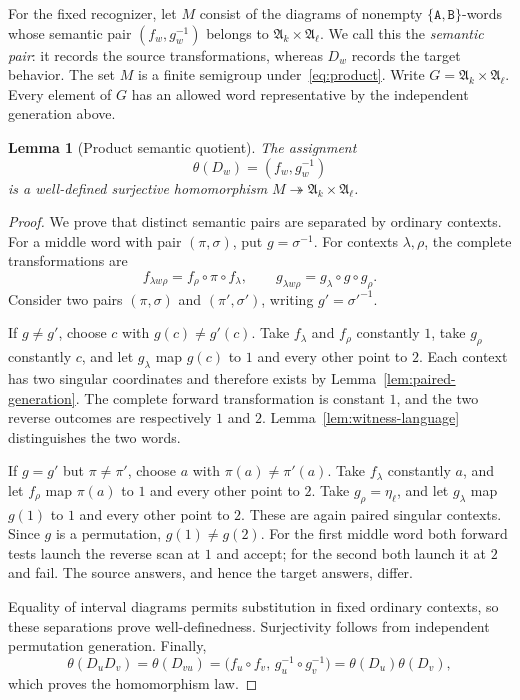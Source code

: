 \documentclass[11pt,a4paper]{article}
\newtheorem{lemma}[theorem]{Lemma}
\theoremstyle{definition}
\theoremstyle{remark}
\newcommand{\Alt}{\mathfrak A}
\begin{document}
For the fixed recognizer, let $M$ consist of the
diagrams of nonempty $\{\mathtt A,\mathtt B\}$-words whose semantic pair
$(f_w,g_w^{-1})$ belongs to $\Alt_k\times\Alt_\ell$. We call this
the \emph{semantic pair}: it records the source transformations,
whereas $D_w$ records the target behavior. The set $M$ is a finite
semigroup under~\eqref{eq:product}. Write
$G=\Alt_k\times\Alt_\ell$. Every element of $G$ has an allowed
word representative by the independent generation above.

\begin{lemma}[Product semantic quotient]\label{lem:semantic-product}
The assignment
\[
 \theta(D_w)=(f_w,g_w^{-1})
\]
is a well-defined surjective homomorphism
$M\twoheadrightarrow\Alt_k\times\Alt_\ell$.
\end{lemma}
\begin{proof}
We prove that distinct semantic pairs are separated by ordinary contexts.
For a middle word with pair $(\pi,\sigma)$, put $g=\sigma^{-1}$. For
contexts $\lambda,\rho$, the complete transformations are
\[
 f_{\lambda w\rho}=f_\rho\circ\pi\circ f_\lambda,
 \qquad
 g_{\lambda w\rho}=g_\lambda\circ g\circ g_\rho.
\]
Consider two pairs $(\pi,\sigma)$ and $(\pi',\sigma')$, writing
$g'=\sigma'^{-1}$.

If $g\ne g'$, choose $c$ with $g(c)\ne g'(c)$. Take $f_\lambda$ and
$f_\rho$ constantly $1$, take $g_\rho$ constantly $c$, and let $g_\lambda$
map $g(c)$ to $1$ and every other point to $2$. Each context has two
singular coordinates and therefore exists by
Lemma~\ref{lem:paired-generation}. The complete forward transformation is
constant $1$, and the two reverse outcomes are respectively $1$ and $2$.
Lemma~\ref{lem:witness-language} distinguishes the two words.

If $g=g'$ but $\pi\ne\pi'$, choose $a$ with $\pi(a)\ne\pi'(a)$.
Take $f_\lambda$ constantly $a$, and let $f_\rho$ map $\pi(a)$ to $1$
and every other point to $2$. Take $g_\rho=\eta_\ell$, and let
$g_\lambda$ map $g(1)$ to $1$ and every other point to $2$.
These are again paired singular contexts. Since $g$ is a permutation,
$g(1)\ne g(2)$. For the first middle word both forward tests launch the
reverse scan at $1$ and accept; for the second both launch it at $2$ and
fail. The source answers, and hence the target answers, differ.

Equality of interval diagrams permits substitution in fixed ordinary
contexts, so these separations prove well-definedness. Surjectivity follows
from independent permutation generation. Finally,
\[
 \theta(D_uD_v)=\theta(D_{vu})
 =\bigl(f_u\circ f_v,\,g_u^{-1}\circ g_v^{-1}\bigr)
 =\theta(D_u)\theta(D_v),
\]
which proves the homomorphism law.
\end{proof}
\end{document}
